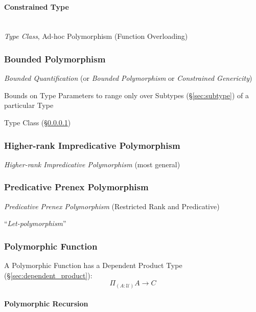 \paragraph{Constrained Type}\label{sec:constrained_type}
\hfill \\

\emph{Type Class}, Ad-hoc Polymorphism (Function Overloading)



\subsubsection{Bounded Polymorphism}\label{sec:bounded_polymorphism}

\emph{Bounded Quantification} (or \emph{Bounded Polymorphism} or
\emph{Constrained Genericity})

Bounds on Type Parameters to range only over Subtypes
(\S\ref{sec:subtype}) of a particular Type

Type Class (\S\ref{sec:constrained_type})



\subsubsection{Higher-rank Impredicative Polymorphism}
\label{sec:higherrank_impredicative}

\emph{Higher-rank Impredicative Polymorphism} (most general)



\subsubsection{Predicative Prenex Polymorphism}
\label{sec:predicative_prened}

\emph{Predicative Prenex Polymorphism} (Restricted Rank and
Predicative)

``\emph{Let-polymorphism}''



\subsubsection{Polymorphic Function}\label{sec:polymorphic_function}

A Polymorphic Function has a Dependent Product Type
(\S\ref{sec:dependent_product}):
\[
  \Pi_{(A:\mathcal{U})} A \rightarrow C
\]



\paragraph{Polymorphic Recursion}\label{sec:polymorphic_recursion}
\hfill \\


